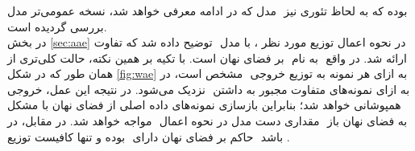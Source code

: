 \subsubsection{\wae} \label{chap2:wae}
مدل  که در ادامه معرفی خواهد شد، نسخه عمومی‌تر مدل \aae{}‎ بوده که به لحاظ تئوری نیز بررسی گردیده است.\\
در بخش ‎\ref{sec:aae}‎ توضیح داده شد که تفاوت ‎\aae{}‎ با مدل ‎\vae{}‎، در نحوه اعمال توزیع مورد نظر بر فضای نهان است. با تکیه بر همین نکته، حالت کلی‌تری از ‎\aae{}‎ به نام ‎\wae{}‎ ارائه شد. در واقع همان طور که در شکل ‎‎\ref{fig:wae}‎ مشخص است، در ‎\vae{}‎ توزیع خروجی ‎\encoder{}‎به ازای هر نمونه به ‎\priordist{}‎ نزدیک می‌شود. در نتیجه این عمل، خروجی ‎\encoder{}‎ به ازای نمونه‌های متفاوت مجبور به داشتن همپوشانی خواهد شد؛ بنابراین بازسازی نمونه‌های داده اصلی از فضای نهان با مشکل مواجه خواهد شد. در مقابل، در ‎\wae{}‎ مقداری دست مدل در نحوه اعمال ‎‎\priordist{}‎ به فضای نهان باز بوده و تنها کافیست توزیع ‎\marginal{}‎ حاکم بر فضای نهان دارای ‎\priordist{}‎ باشد \cite{wae}.\\
